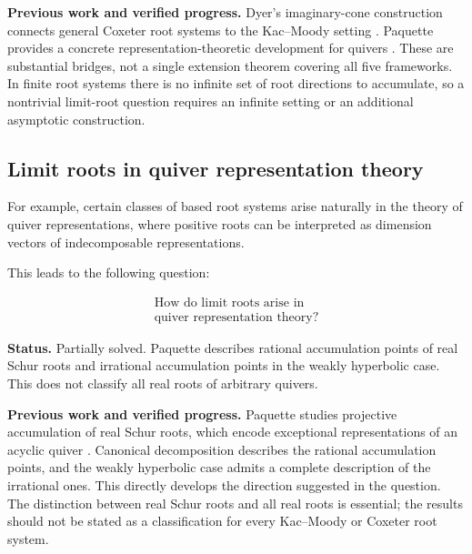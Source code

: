\documentclass[11pt,reqno]{amsart}
\theoremstyle{plain}
\theoremstyle{definition}
\theoremstyle{remark}
\numberwithin{equation}{section}
\begin{document}
\par\medskip
\noindent\textbf{Previous work and verified progress.}
Dyer's imaginary-cone construction connects general Coxeter root
systems to the Kac--Moody setting \cite{Dyer2019}. Paquette provides a
concrete representation-theoretic development for quivers
\cite{Paquette2016}. These are substantial bridges, not a single extension
theorem covering all five frameworks. In finite root systems there is
no infinite set of root directions to accumulate, so a nontrivial limit-root
question requires an infinite setting or an additional asymptotic construction.

\subsection{Limit roots in quiver representation theory}

For example, certain classes of based root systems
arise naturally in the theory of quiver representations,
where positive roots can be interpreted as dimension
vectors of indecomposable representations.

This leads to the following question:

\[
\boxed{
\begin{gathered}
\text{How do limit roots arise in}\\
\text{quiver representation theory?}
\end{gathered}
}
\]


\par\medskip
\noindent\textbf{Status.} Partially solved. Paquette describes rational accumulation points of real Schur roots and irrational accumulation points in the weakly hyperbolic case. This does not classify all real roots of arbitrary quivers.

\par\medskip
\noindent\textbf{Previous work and verified progress.}
Paquette studies projective accumulation of real Schur roots,
which encode exceptional representations of an acyclic quiver
\cite{Paquette2016}. Canonical decomposition describes the rational
accumulation points, and the weakly hyperbolic case admits a complete
description of the irrational ones. This directly develops the direction
suggested in the question. The distinction between real Schur roots and
all real roots is essential; the results should not be stated as a
classification for every Kac--Moody or Coxeter root system.



\end{document}
